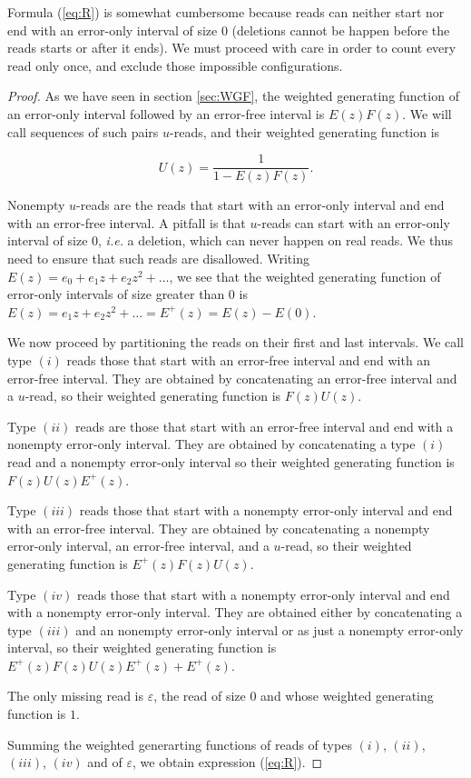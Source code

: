 \documentclass{article}
\begin{document}
Formula (\ref{eq:R}) is somewhat cumbersome because reads can neither
start nor end with an error-only interval of size $0$ (deletions cannot be
happen before the reads starts or after it ends). We must proceed with
care in order to count every read only once, and exclude those impossible
configurations.

\begin{proof}
As we have seen in section \ref{sec:WGF}, the weighted generating function
of an error-only interval followed by an error-free interval is
$E(z)F(z)$. We will call sequences of such pairs $u$-reads, and
their weighted generating function is

\begin{equation*}
U(z) = \frac{1}{1-E(z)F(z)}.
\end{equation*}

Nonempty $u$-reads are the reads that start with an error-only interval
and end with an error-free interval. A pitfall is that $u$-reads can start
with an error-only interval of size $0$, \textit{i.e.} a deletion, which
can never happen on real reads. We thus need to ensure that such reads are
disallowed. Writing $E(z) = e_0 + e_1z + e_2z^2 + \ldots$, we see that the
weighted generating function of error-only intervals of size greater than
$0$ is $E(z) = e_1z + e_2z^2 + \ldots = E^+(z) = E(z) - E(0)$. 

We now proceed by partitioning the reads on their first and last intervals.
We call type $(i)$ reads those that start with an error-free interval and
end with an error-free interval. They are obtained by concatenating an
error-free interval and a $u$-read, so their weighted generating function
is $F(z)U(z)$.

Type $(ii)$ reads are those that start with an error-free interval and end
with a nonempty error-only interval. They are obtained by concatenating a
type $(i)$ read and a nonempty error-only interval so their weighted
generating function is $F(z)U(z)E^+(z)$.

Type $(iii)$ reads those that start with a nonempty error-only interval
and end with an error-free interval. They are obtained by concatenating a
nonempty error-only interval, an error-free interval, and a $u$-read, so
their weighted generating function is $E^+(z)F(z)U(z)$.

Type $(iv)$ reads those that start with a nonempty error-only interval and
end with a nonempty error-only interval. They are obtained either by
concatenating a type $(iii)$ and an nonempty error-only interval or as
just a nonempty error-only interval, so their weighted generating function
is $E^+(z)F(z)U(z)E^+(z) + E^+(z)$.

The only missing read is $\varepsilon$, the read of size $0$ and whose
weighted generating function is $1$.

Summing the weighted generarting functions of reads of types $(i)$,
$(ii)$, $(iii)$, $(iv)$ and of $\varepsilon$, we obtain expression
(\ref{eq:R}).
\end{proof}
\end{document}
